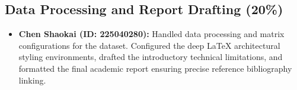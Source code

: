 \documentclass[10pt, twocolumn]{article}
\begin{document}
\subsection*{Data Processing and Report Drafting (20\%)}
\begin{itemize}
\item \textbf{Chen Shaokai (ID: 225040280):} Handled data processing and matrix configurations for the dataset. Configured the deep LaTeX architectural styling environments, drafted the introductory technical limitations, and formatted the final academic report ensuring precise reference bibliography linking.
\end{itemize}
\end{document}
